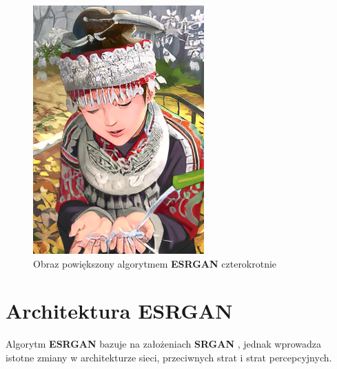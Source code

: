 \begin{figure}[ht]
\begin{minipage}[t]{0.4\linewidth}
        \includegraphics[width=\linewidth]{Rozdziały/02.Podstawy_teoretyczne/Obrazy/comic_ESRGAN_x4.png}
        \caption{Obraz powiększony algorytmem \textbf{ESRGAN} czterokrotnie}
        \label{fig:image61}
    \end{minipage}
\end{figure}

\newpage
\section{Architektura ESRGAN}

Algorytm \textbf{ESRGAN} bazuje na założeniach \textbf{SRGAN} \cite{Ledig_2017_CVPR}, jednak wprowadza istotne zmiany w architekturze sieci, przeciwnych strat i strat percepcyjnych.

